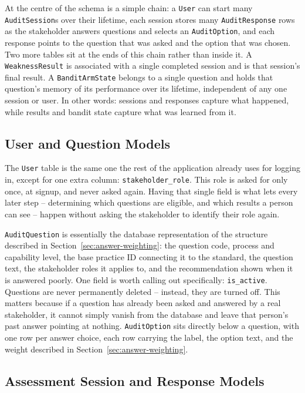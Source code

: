 \documentclass[a4paper, 12pt, oneside, openany, BCOR1cm,toc=chapterentrywithdots]{scrbook}
\begin{document}
At the centre of the schema is a simple chain: a \texttt{User} can start many
\texttt{AuditSession}s over their lifetime, each session stores many \texttt{AuditResponse} rows
as the stakeholder answers questions and selects an \texttt{AuditOption}, and each response
points to the question that was asked and the option that was chosen. Two more tables sit at the
ends of this chain rather than inside it. A \texttt{WeaknessResult} is associated with a single
completed session and is that session's final result. A \texttt{BanditArmState} belongs to a
single question and holds that question's memory of its performance over its lifetime,
independent of any one session or user. In other words: sessions and responses capture what
happened, while results and bandit state capture what was learned from it.

\subsection{User and Question Models}

The \texttt{User} table is the same one the rest of the application already uses for logging in,
except for one extra column: \texttt{stakeholder\_role}. This role is asked for only once, at
signup, and never asked again. Having that single field is what lets every later step --
determining which questions are eligible, and which results a person can see -- happen without
asking the stakeholder to identify their role again.

\texttt{AuditQuestion} is essentially the database representation of the structure described in
Section~\ref{sec:answer-weighting}: the question code, process and capability level, the base
practice ID connecting it to the standard, the question text, the stakeholder roles it applies
to, and the recommendation shown when it is answered poorly. One field is worth calling out
specifically: \texttt{is\_active}. Questions are never permanently deleted -- instead, they are
turned off. This matters because if a question has already been asked and answered by a real
stakeholder, it cannot simply vanish from the database and leave that person's past answer
pointing at nothing. \texttt{AuditOption} sits directly below a question, with one row per answer
choice, each row carrying the label, the option text, and the weight described in
Section~\ref{sec:answer-weighting}.

\subsection{Assessment Session and Response Models}
\end{document}
